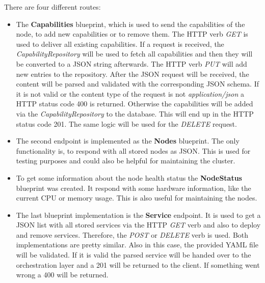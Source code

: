 There are four different routes:\newline
\begin{itemize}
  \item The \textbf{Capabilities} blueprint, which is used to send the capabilities of the node, to add new capabilities or to remove them.
  The \ac{HTTP} verb \textit{GET} is used to deliver all existing capabilities.
  If a request is received, the \textit{CapabilityRepository} will be used to fetch all capabilities and then they will be converted to a JSON string afterwards.
  The \ac{HTTP} verb \textit{PUT} will add new entries to the repository.
  After the \ac{JSON} request will be received, the content will be parsed and validated with the corresponding \ac{JSON} schema.
  If it is not valid or the content type of the request is not \textit{application/json} a \ac{HTTP} status code 400 is returned.
  Otherwise the capabilities will be added via the \textit{CapabilityRepository} to the database.
  This will end up in the \ac{HTTP} status code 201.
  The same logic will be used for the \textit{DELETE} request.
  \item The second endpoint is implemented as the \textbf{Nodes} blueprint.
  The only functionality is, to respond with all stored nodes as \ac{JSON}.
  This is used for testing purposes and could also be helpful for maintaining the cluster.
  \item To get some information about the node health status the \textbf{NodeStatus} blueprint was created.
  It respond with some hardware information, like the current \ac{CPU} or memory usage.
  This is also useful for maintaining the nodes.
  \item The last blueprint implementation is the \textbf{Service} endpoint.
  It is used to get a \ac{JSON} list with all stored services via the \ac{HTTP} \textit{GET} verb and also to deploy and remove services.
  Therefore, the \textit{POST} or \textit{DELETE} verb is used.
  Both implementations are pretty similar.
  Also in this case, the provided \ac{YAML} file will be validated.
  If it is valid the parsed service will be handed over to the orchestration layer and a 201 will be returned to the client.
  If something went wrong a 400 will be returned.
\end{itemize}

